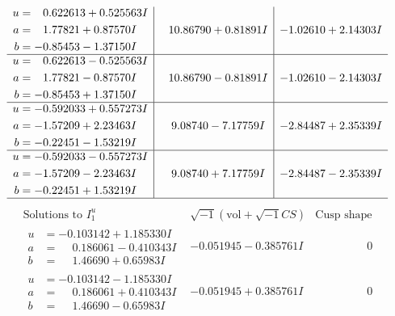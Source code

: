 \documentclass[1p]{elsarticle_modified}
\theoremstyle{definition}
\newcommand{\I}{\sqrt{-1}}
\begin{document}
$$\begin{array}{c|c|c}
\begin{aligned}
u &= \phantom{-}0.622613 + 0.525563 I \\
a &= \phantom{-}1.77821 + 0.87570 I \\
b &= -0.85453 - 1.37150 I\end{aligned}
 & \phantom{-}10.86790 + 0.81891 I & -1.02610 + 2.14303 I \\ \hline\begin{aligned}
u &= \phantom{-}0.622613 - 0.525563 I \\
a &= \phantom{-}1.77821 - 0.87570 I \\
b &= -0.85453 + 1.37150 I\end{aligned}
 & \phantom{-}10.86790 - 0.81891 I & -1.02610 - 2.14303 I \\ \hline\begin{aligned}
u &= -0.592033 + 0.557273 I \\
a &= -1.57209 + 2.23463 I \\
b &= -0.22451 - 1.53219 I\end{aligned}
 & \phantom{-}9.08740 - 7.17759 I & -2.84487 + 2.35339 I \\ \hline\begin{aligned}
u &= -0.592033 - 0.557273 I \\
a &= -1.57209 - 2.23463 I \\
b &= -0.22451 + 1.53219 I\end{aligned}
 & \phantom{-}9.08740 + 7.17759 I & -2.84487 - 2.35339 I\\
 \hline 
 \end{array}$$\newpage$$\begin{array}{c|c|c}  
\text{Solutions to }I^u_{1}& \I (\text{vol} + \sqrt{-1}CS) & \text{Cusp shape}\\
 \hline 
\begin{aligned}
u &= -0.103142 + 1.185330 I \\
a &= \phantom{-}0.186061 - 0.410343 I \\
b &= \phantom{-}1.46690 + 0.65983 I\end{aligned}
 & -0.051945 - 0.385761 I & \phantom{-0.000000 } 0 \\ \hline\begin{aligned}
u &= -0.103142 - 1.185330 I \\
a &= \phantom{-}0.186061 + 0.410343 I \\
b &= \phantom{-}1.46690 - 0.65983 I\end{aligned}
 & -0.051945 + 0.385761 I & \phantom{-0.000000 } 0 \\ \hline\begin{aligned}

\end{aligned}
\end{array}$$
\end{document}
